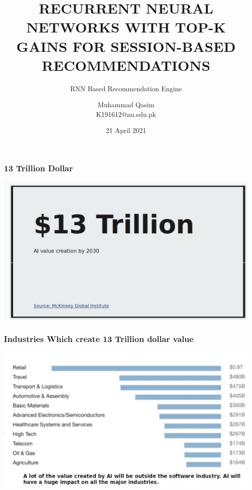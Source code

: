 \documentclass{beamer}
\title[RECURRENT NEURAL NETWORKS WITH TOP-K GAINS  FOR SESSION-BASED RECOMMENDATIONS]{RECURRENT NEURAL NETWORKS WITH TOP-K GAINS  FOR SESSION-BASED RECOMMENDATIONS}
\subtitle{RNN Based Recommendation Engine}
\author{Muhammad Qasim \\ K191612@nu.edu.pk}
\institute[]{National University of Computer & Emerging Sciences}
\date{21 April 2021}
\begin{document}
\begin{frame}
 \maketitle
\end{frame}


\begin{frame}
\frametitle{13 Trillion Dollar}
\includegraphics[width=\textwidth]{13 trillion.JPG}
\end{frame}


\begin{frame}
\frametitle{Industries Which create 13 Trillion dollar value}
\includegraphics[width=\textwidth]{13 trillion_distribution.JPG}
\end{frame}


\end{document}
